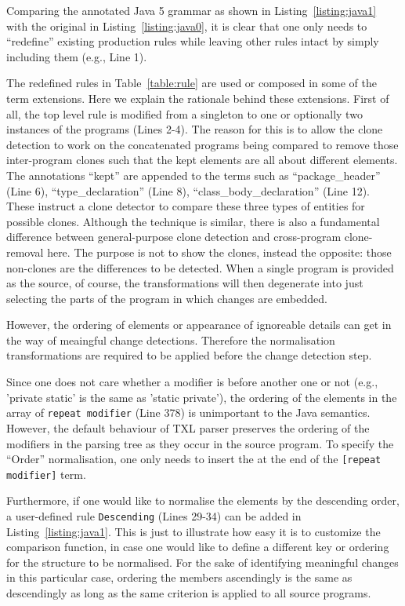 \documentclass[10pt, conference, compsocconf]{IEEEtran}
\begin{document}
Comparing the annotated Java 5 grammar as shown in Listing~\ref{listing:java1} with the original in Listing~\ref{listing:java0}, it is clear that one only needs to ``redefine'' existing production rules while leaving other rules intact by simply including them (e.g., Line 1).

The redefined rules in Table~\ref{table:rule} are used or composed in some of the term extensions. Here we explain the rationale behind these extensions. First of all, the top level rule is modified from a singleton to one or optionally two instances of the programs (Lines 2-4). The reason for this is to allow the clone detection to work on the concatenated programs being compared to remove those inter-program clones such that the kept elements are all about different elements. The annotations ``kept'' are appended to the terms such as ``package\_header'' (Line 6), ``type\_declaration'' (Line 8), ``class\_body\_declaration'' (Line 12). These instruct a clone detector to compare these three types of entities for possible clones. Although the technique is similar, there is also a fundamental difference between general-purpose clone detection and cross-program clone-removal here. The purpose is not to show the clones, instead the opposite: those non-clones are the differences to be detected.
When a single program is provided as the source, of course, the transformations will then degenerate into just selecting the  parts of the program in which changes are embedded.

However, the ordering of elements or appearance of ignoreable details can get in the way of meaingful change detections. Therefore the normalisation transformations are required to be applied before the change detection step. 

Since one does not care whether a modifier is before another one or not (e.g., 'private static' is the same as 'static private'), the ordering of the elements in the array of {\tt repeat modifier}  (Line 378) is unimportant to the Java semantics. However, the default behaviour of TXL parser preserves the ordering of the modifiers in the parsing tree as they occur in the source program. To specify the ``Order'' normalisation, one only needs to insert the  at the end of the {\tt [repeat modifier]} term.

Furthermore, if one would like to normalise the elements by the descending order, a user-defined rule {\tt Descending} (Lines 29-34) can be added in Listing~\ref{listing:java1}. This is just to illustrate how easy it is to customize the comparison function, in case one would like to define a different key or ordering for the structure to be normalised. For the sake of identifying meaningful changes in this particular case, ordering the members ascendingly is the same as descendingly as long as the same criterion is applied to all source programs.
\end{document}
